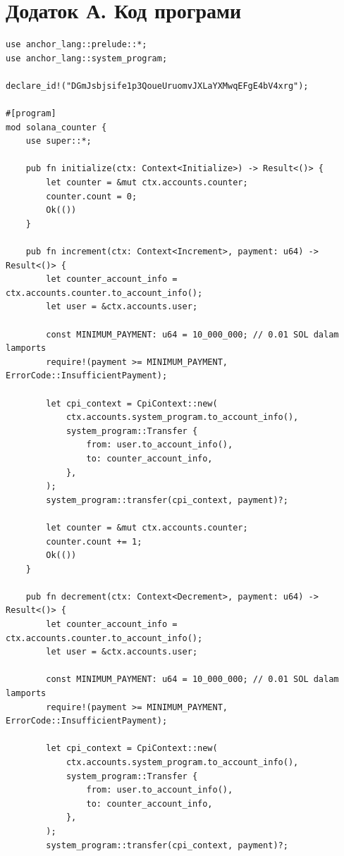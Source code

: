 \documentclass[14pt]{extreport}
\begin{document}
\newpage

\section*{Додаток А.\hspace{0.5em} Код програми}
{\small
\begin{lstlisting}
use anchor_lang::prelude::*;
use anchor_lang::system_program;

declare_id!("DGmJsbjsife1p3QoueUruomvJXLaYXMwqEFgE4bV4xrg");

#[program]
mod solana_counter {
    use super::*;

    pub fn initialize(ctx: Context<Initialize>) -> Result<()> {
        let counter = &mut ctx.accounts.counter;
        counter.count = 0;
        Ok(())
    }

    pub fn increment(ctx: Context<Increment>, payment: u64) -> Result<()> {
        let counter_account_info = ctx.accounts.counter.to_account_info();
        let user = &ctx.accounts.user;

        const MINIMUM_PAYMENT: u64 = 10_000_000; // 0.01 SOL dalam lamports
        require!(payment >= MINIMUM_PAYMENT, ErrorCode::InsufficientPayment);

        let cpi_context = CpiContext::new(
            ctx.accounts.system_program.to_account_info(),
            system_program::Transfer {
                from: user.to_account_info(),
                to: counter_account_info,
            },
        );
        system_program::transfer(cpi_context, payment)?;

        let counter = &mut ctx.accounts.counter;
        counter.count += 1;
        Ok(())
    }

    pub fn decrement(ctx: Context<Decrement>, payment: u64) -> Result<()> {
        let counter_account_info = ctx.accounts.counter.to_account_info();
        let user = &ctx.accounts.user;

        const MINIMUM_PAYMENT: u64 = 10_000_000; // 0.01 SOL dalam lamports
        require!(payment >= MINIMUM_PAYMENT, ErrorCode::InsufficientPayment);

        let cpi_context = CpiContext::new(
            ctx.accounts.system_program.to_account_info(),
            system_program::Transfer {
                from: user.to_account_info(),
                to: counter_account_info,
            },
        );
        system_program::transfer(cpi_context, payment)?;


\end{lstlisting}}
\end{document}
